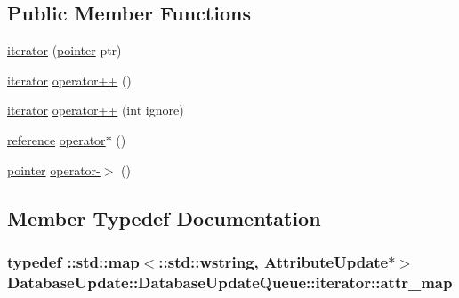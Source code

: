 \subsection*{Public Member Functions}
\begin{DoxyCompactItemize}
\item 
\hyperlink{class_database_update_1_1_database_update_queue_1_1iterator_ad086692313424a551414a9ee1b2a1d54}{iterator} (\hyperlink{class_database_update_1_1_database_update_queue_1_1iterator_ad4b0114dbec483b1e2148ea9736bf6d6}{pointer} ptr)
\item 
\hyperlink{class_database_update_1_1_database_update_queue_1_1iterator}{iterator} \hyperlink{class_database_update_1_1_database_update_queue_1_1iterator_aa3949987e42ec0a33dba4c15a2a814ab}{operator++} ()
\item 
\hyperlink{class_database_update_1_1_database_update_queue_1_1iterator}{iterator} \hyperlink{class_database_update_1_1_database_update_queue_1_1iterator_a0c8fb7c71034410f856f045bc469f515}{operator++} (int ignore)
\item 
\hyperlink{class_database_update_1_1_database_update_queue_1_1iterator_a9268647f1d1c17503c8af12faacc761a}{reference} \hyperlink{class_database_update_1_1_database_update_queue_1_1iterator_ab09ceb215197dda58bb59e5eff73d24a}{operator$\ast$} ()
\item 
\hyperlink{class_database_update_1_1_database_update_queue_1_1iterator_ad4b0114dbec483b1e2148ea9736bf6d6}{pointer} \hyperlink{class_database_update_1_1_database_update_queue_1_1iterator_af9634c2af52e3422fb6c61cb9a9dfdf9}{operator-\/$>$} ()
\end{DoxyCompactItemize}


\subsection{Member Typedef Documentation}
\hypertarget{class_database_update_1_1_database_update_queue_1_1iterator_a1592e8e7815b536c6e419a383935913b}{}
\subsubsection[{attr\+\_\+map}]{\setlength{\rightskip}{0pt plus 5cm}typedef \+::std\+::map$<$\+::std\+::wstring, {\bf Attribute\+Update}$\ast$$>$ {\bf Database\+Update\+::\+Database\+Update\+Queue\+::iterator\+::attr\+\_\+map}}\label{class_database_update_1_1_database_update_queue_1_1iterator_a1592e8e7815b536c6e419a383935913b}
\hypertarget{class_database_update_1_1_database_update_queue_1_1iterator_afd453e8c03f82a4ad9b36ff0c7e3dac6}{}
